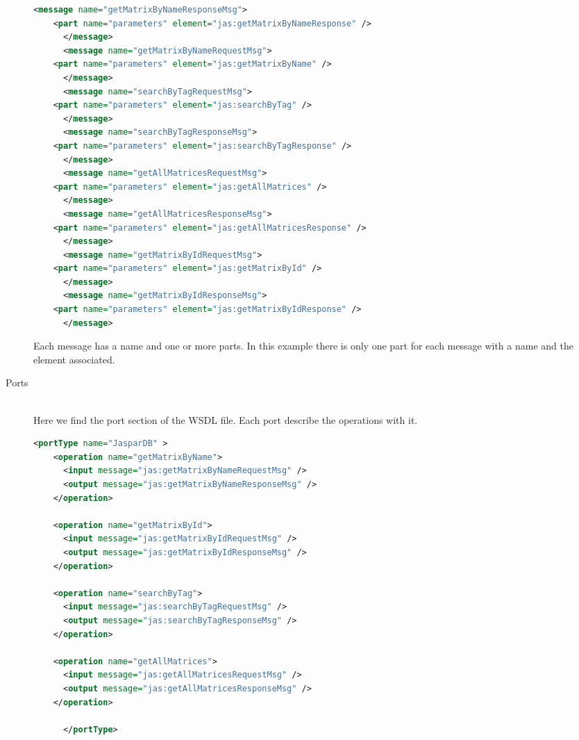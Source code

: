 \documentclass[a4paper,10pt]{article}
\begin{document}
\begin{description}
      \begin{lstlisting}[language=XML]    
      <message name="getMatrixByNameResponseMsg">
	<part name="parameters" element="jas:getMatrixByNameResponse" />
      </message>
      <message name="getMatrixByNameRequestMsg">
	<part name="parameters" element="jas:getMatrixByName" />
      </message>
      <message name="searchByTagRequestMsg">
	<part name="parameters" element="jas:searchByTag" />
      </message>
      <message name="searchByTagResponseMsg">
	<part name="parameters" element="jas:searchByTagResponse" />
      </message>
      <message name="getAllMatricesRequestMsg">
	<part name="parameters" element="jas:getAllMatrices" />
      </message>
      <message name="getAllMatricesResponseMsg">
	<part name="parameters" element="jas:getAllMatricesResponse" />
      </message>
      <message name="getMatrixByIdRequestMsg">
	<part name="parameters" element="jas:getMatrixById" />
      </message>
      <message name="getMatrixByIdResponseMsg">
	<part name="parameters" element="jas:getMatrixByIdResponse" />
      </message>
      \end{lstlisting}

      Each message has a name and one or more parts. In this example there is only one part for each message with a name and the element associated.

      \item[Ports] \hfill \\

      Here we find the port section of the WSDL file. Each port describe the operations with it.

      \begin{lstlisting}[language=XML]    
      <portType name="JasparDB" >
	<operation name="getMatrixByName">
	  <input message="jas:getMatrixByNameRequestMsg" />
	  <output message="jas:getMatrixByNameResponseMsg" />
	</operation>

	<operation name="getMatrixById">
	  <input message="jas:getMatrixByIdRequestMsg" />
	  <output message="jas:getMatrixByIdResponseMsg" />
	</operation>

	<operation name="searchByTag">
	  <input message="jas:searchByTagRequestMsg" />
	  <output message="jas:searchByTagResponseMsg" />
	</operation>

	<operation name="getAllMatrices">
	  <input message="jas:getAllMatricesRequestMsg" />
	  <output message="jas:getAllMatricesResponseMsg" />
	</operation>

      </portType>
      \end{lstlisting}


\end{description}
\end{document}
